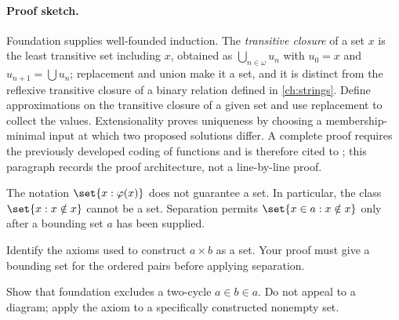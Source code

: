 \paragraph{Proof sketch.}
Foundation supplies well-founded induction.  The \emph{transitive closure}
of a set \(x\) is the least transitive set including \(x\), obtained as
\(\bigcup_{n\in\omega}u_n\) with \(u_0=x\) and
\(u_{n+1}=\bigcup u_n\); replacement and union make it a set, and it is
distinct from the reflexive transitive closure of a binary relation defined
in \cref{ch:strings}.  Define approximations on the
transitive closure of a given set and use replacement to collect the values.
Extensionality proves uniqueness by choosing a membership-minimal input at
which two proposed solutions differ.  A complete proof requires the previously
developed coding of functions and is therefore cited to \cite{Jech2003}; this
paragraph records the proof architecture, not a line-by-line proof.

\begin{warning}
The notation \(\set{x:\varphi(x)}\) does not guarantee a set.  In particular,
the class \(\set{x:x\notin x}\) cannot be a set.  Separation permits
\(\set{x\in a:x\notin x}\) only after a bounding set \(a\) has been supplied.
\end{warning}

\begin{exercise}
\label{ex:zf-zfc-01}
Identify the axioms used to construct \(a\times b\) as a set.  Your proof must
give a bounding set for the ordered pairs before applying separation.
\end{exercise}

\begin{exercise}
\label{ex:zf-zfc-02}
Show that foundation excludes a two-cycle \(a\in b\in a\).  Do not appeal to a
diagram; apply the axiom to a specifically constructed nonempty set.
\end{exercise}

